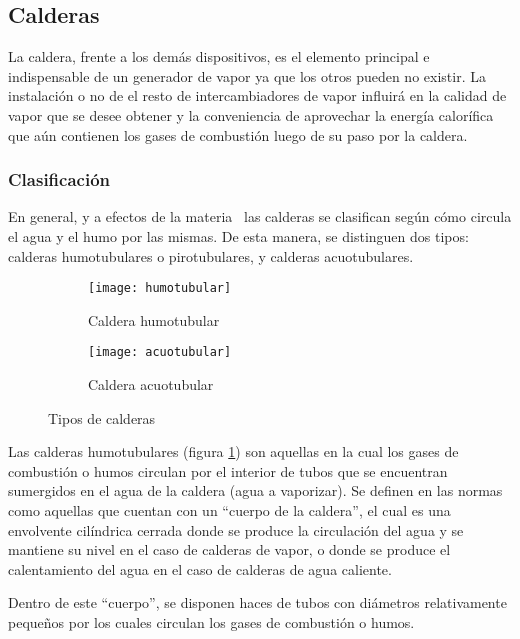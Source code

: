 \subsection{Calderas}

La caldera, frente a los demás dispositivos, es el elemento principal e indispensable de un generador de vapor ya que los otros pueden no existir. La instalación o no de el resto de intercambiadores de vapor influirá en la calidad de vapor que se desee obtener y la conveniencia de aprovechar la energía calorífica que aún contienen los gases de combustión luego de su paso por la caldera.

\subsubsection{Clasificación}

En general, y a efectos de la materia \materia\ las calderas se clasifican según cómo circula el agua y el humo por las mismas. De esta manera, se distinguen dos tipos: calderas humotubulares o pirotubulares, y calderas acuotubulares.

\begin{figure}[!h]
	\centering
	\begin{subfigure}[b]{.4\linewidth}
		\texttt{[image: humotubular]}
		\caption{Caldera humotubular}
		\label{fig:caldera-humo}
	\end{subfigure}
	\begin{subfigure}[b]{.4\linewidth}
		\texttt{[image: acuotubular]}
		\caption{Caldera acuotubular}
		\label{fig:caldera-acuo}
	\end{subfigure}
	\caption{Tipos de calderas}
\end{figure}


Las calderas humotubulares (figura \ref{fig:caldera-humo}) son aquellas en la cual los gases de combustión o humos circulan por el interior de tubos que se encuentran sumergidos en el agua de la caldera (agua a vaporizar). Se definen en las normas como aquellas que cuentan con un ``cuerpo de la caldera'', el cual es una envolvente cilíndrica cerrada donde se produce la circulación del agua y se mantiene su nivel en el caso de calderas de vapor, o donde se produce el calentamiento del agua en el caso de calderas de agua caliente.

Dentro de este ``cuerpo'', se disponen haces de tubos con diámetros relativamente pequeños por los cuales circulan los gases de combustión o humos.


